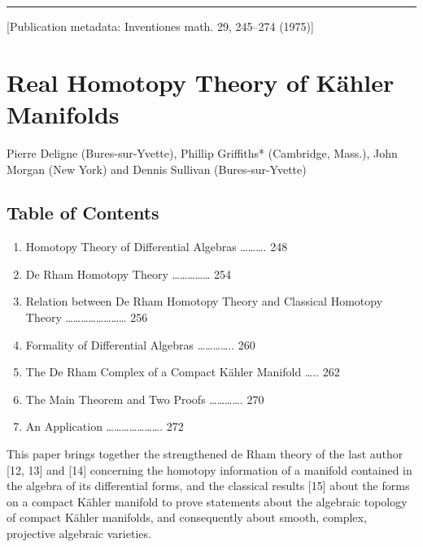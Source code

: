 \documentclass[
  english,
  a3paper,
  a3paper]{extarticle}
\author{}
\date{}
\providecommand{\tightlist}{%
  \setlength{\itemsep}{0pt}\setlength{\parskip}{0pt}}
\begin{document}



\par

\vspace{0.7mm}\hrule\vspace{1.6mm}

\fontsize{9}{11}\selectfont

{[}Publication metadata: Inventiones math. 29, 245--274 (1975){]}

\section{Real Homotopy Theory of Kähler
Manifolds}\label{real-homotopy-theory-of-kuxe4hler-manifolds}

Pierre Deligne (Bures-sur-Yvette), Phillip Griffiths* (Cambridge,
Mass.), John Morgan (New York) and Dennis Sullivan (Bures-sur-Yvette)

\subsection{Table of Contents}\label{table-of-contents}

\begin{enumerate}
\def\labelenumi{\arabic{enumi}.}
\tightlist
\item
  Homotopy Theory of Differential Algebras \ldots\ldots\ldots. 248
\item
  De Rham Homotopy Theory \ldots\ldots\ldots\ldots\ldots{} 254
\item
  Relation between De Rham Homotopy Theory and Classical Homotopy Theory
  \ldots\ldots\ldots\ldots\ldots\ldots\ldots\ldots{} 256
\item
  Formality of Differential Algebras \ldots\ldots\ldots\ldots.. 260
\item
  The De Rham Complex of a Compact Kähler Manifold \ldots.. 262
\item
  The Main Theorem and Two Proofs \ldots\ldots\ldots\ldots. 270
\item
  An Application \ldots\ldots\ldots\ldots\ldots\ldots\ldots. 272
\end{enumerate}

This paper brings together the strengthened de Rham theory of the last
author {[}12, 13{]} and {[}14{]} concerning the homotopy information of
a manifold contained in the algebra of its differential forms, and the
classical results {[}15{]} about the forms on a compact Kähler manifold
to prove statements about the algebraic topology of compact Kähler
manifolds, and consequently about smooth, complex, projective algebraic
varieties.
\end{document}
